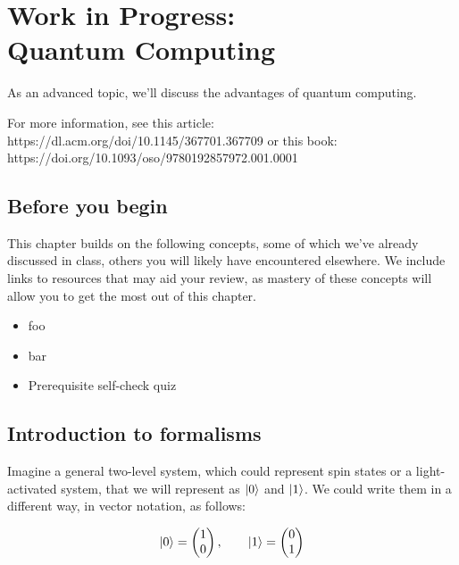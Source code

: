 \documentclass[12pt, english]{book}
\begin{document}
\chapter[Quantum computing]{Work in Progress:\\Quantum Computing} \label{ch:computing}
As an advanced topic, we'll discuss the advantages of quantum computing.


For more information, see this article: https://dl.acm.org/doi/10.1145/367701.367709
or this book: https://doi.org/10.1093/oso/9780192857972.001.0001



\section{Before you begin}

This chapter builds on the following concepts, some of which we've already discussed in class, others you will likely have encountered elsewhere.
We include links to resources that may aid your review, as mastery of these concepts will allow you to get the most out of this chapter.

\begin{itemize}
	\item foo 
	\item bar 
	\item Prerequisite self-check quiz 
\end{itemize}




\section{Introduction to formalisms}

Imagine a general two-level system, which could represent spin states or a light-activated system, that we will represent as $\ket{0}$ and $\ket{1}$.
We could write them in a different way, in vector notation, as follows:

\begin{equation*}
	\ket{0} = \begin{pmatrix} 1 \\ 0 \end{pmatrix}, \qquad \ket{1} = \begin{pmatrix} 0 \\ 1 \end{pmatrix} 
\end{equation*}
\end{document}

